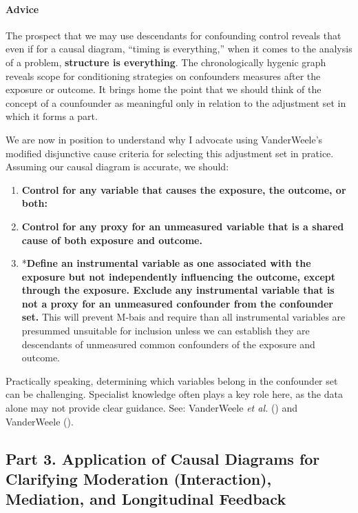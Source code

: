 \documentclass[
  singlecolumn,
  9pt]{article}
\let\oldparagraph\paragraph
\renewcommand{\paragraph}[1]{\oldparagraph{#1}\mbox{}}
\providecommand{\tightlist}{%
  \setlength{\itemsep}{0pt}\setlength{\parskip}{0pt}}\usepackage{longtable,booktabs,array}
\begin{document}
\paragraph{Advice}\label{advice-2}

The prospect that we may use descendants for confounding control reveals
that even if for a causal diagram, ``timing is everything,'' when it
comes to the analysis of a problem, \textbf{structure is everything}.
The chronologically hygenic graph reveals scope for conditioning
strategies on confounders measures after the exposure or outcome. It
brings home the point that we should think of the concept of a
counfounder as meaningful only in relation to the adjustment set in
which it forms a part.

We are now in position to understand why I advocate using VanderWeele's
modified disjunctive cause criteria for selecting this adjustment set in
pratice. Assuming our causal diagram is accurate, we should:

\begin{enumerate}
\def\labelenumi{\alph{enumi}.}
\tightlist
\item
  \textbf{Control for any variable that causes the exposure, the
  outcome, or both:}
\item
  \textbf{Control for any proxy for an unmeasured variable that is a
  shared cause of both exposure and outcome.}
\item
  *\textbf{Define an instrumental variable as one associated with the
  exposure but not independently influencing the outcome, except through
  the exposure. Exclude any instrumental variable that is not a proxy
  for an unmeasured confounder from the confounder set.} This will
  prevent M-bais and require than all instrumental variables are
  presummed unsuitable for inclusion unless we can establish they are
  descendants of unmeasured common confounders of the exposure and
  outcome.
\end{enumerate}

Practically speaking, determining which variables belong in the
confounder set can be challenging. Specialist knowledge often plays a
key role here, as the data alone may not provide clear guidance. See:
VanderWeele \emph{et al.} () and
VanderWeele ().

\subsection{Part 3. Application of Causal Diagrams for Clarifying
Moderation (Interaction), Mediation, and Longitudinal
Feedback}\label{part-3.-application-of-causal-diagrams-for-clarifying-moderation-interaction-mediation-and-longitudinal-feedback}
\end{document}
